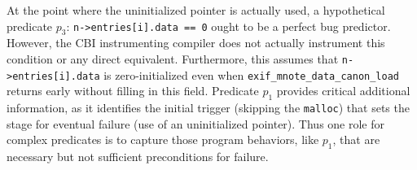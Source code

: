 At the point where the uninitialized pointer is actually used, a hypothetical predicate $p_3$: \texttt{n->entries[i].data == 0} ought to be a perfect bug predictor.  However, the CBI instrumenting compiler does not actually instrument this condition or any direct equivalent.  Furthermore, this assumes that \texttt{n->entries[i].data} is zero-initialized even when \texttt{exif\_mnote\_data\_canon\_load} returns early without filling in this field.  Predicate $p_1$ provides critical additional information, as it identifies the initial trigger (skipping the \texttt{malloc}) that sets the stage for eventual failure (use of an uninitialized pointer).  Thus one role for complex predicates is to capture those program behaviors, like $p_1$, that are necessary but not sufficient preconditions for failure.

